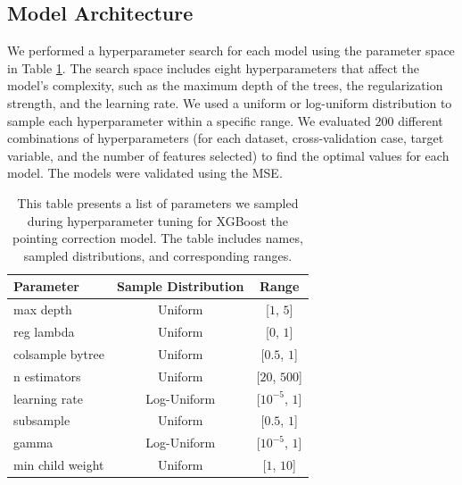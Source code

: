 \subsection{Model Architecture}
We performed a hyperparameter search for each model using the parameter space in Table \ref{tab:xgb_hyperparameters_pcorr}.
The search space includes eight hyperparameters that affect the model's complexity, such as the maximum depth of the trees, the regularization strength, and the learning rate.
We used a uniform or log-uniform distribution to sample each hyperparameter within a specific range.
We evaluated $200$ different combinations of hyperparameters (for each dataset, cross-validation case, target variable, and the number of features selected) to find the optimal values for each model.
The models were validated using the MSE.

\begin{table}[H]
    \centering
    \caption[Hyperparameter search space for XGBoost pointing correction model]{This table presents a list of parameters we sampled during hyperparameter tuning for XGBoost the pointing correction model. The table includes names, sampled distributions, and corresponding ranges.}
    \begin{tabular}{lcc}
        \toprule
        \textbf{Parameter} & \textbf{Sample Distribution} & \textbf{Range} \\ \hline
        max depth & Uniform & [$1$, $5$] \\ 
        reg lambda & Uniform & [$0$, $1$] \\ 
        colsample bytree & Uniform & [$0.5$, $1$] \\ 
        n estimators & Uniform & [$20$, $500$] \\ 
        learning rate & Log-Uniform & [$10^{-5}$, $1$] \\ 
        subsample & Uniform & [$0.5$, $1$] \\ 
        gamma & Log-Uniform & [$10^{-5}$, $1$] \\ 
        min child weight & Uniform & [$1$, $10$] \\ 
        \bottomrule
    \end{tabular}
    \label{tab:xgb_hyperparameters_pcorr}
\end{table}



